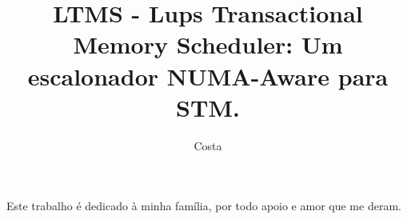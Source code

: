 \documentclass[diss,capa]{texufpel}
\title{LTMS - Lups Transactional Memory Scheduler: Um escalonador NUMA-Aware para STM.}
\author{Costa}{Michael Alexandre}
\begin{document}

\maketitle 

\sloppy

\fichacatalografica





\begin{dedicatoria}
  Este trabalho é dedicado à minha família, por todo apoio e amor que me deram.
\end{dedicatoria}
\end{document}
